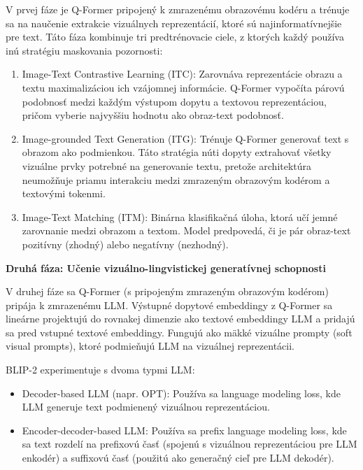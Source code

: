 \documentclass[]{tukediphc}
\begin{document}
V prvej fáze je Q-Former pripojený k zmrazenému obrazovému kodéru a trénuje sa na naučenie extrakcie vizuálnych reprezentácií, ktoré sú najinformatívnejšie pre text. Táto fáza kombinuje tri predtrénovacie ciele, z ktorých každý používa inú stratégiu maskovania pozornosti:

\begin{enumerate}
    \item Image-Text Contrastive Learning (ITC): Zarovnáva reprezentácie obrazu a textu maximalizáciou ich vzájomnej informácie. Q-Former vypočíta párovú podobnosť medzi každým výstupom dopytu a textovou reprezentáciou, pričom vyberie najvyššiu hodnotu ako obraz-text podobnosť.
    
    \item Image-grounded Text Generation (ITG): Trénuje Q-Former generovať text s obrazom ako podmienkou. Táto stratégia núti dopyty extrahovať všetky vizuálne prvky potrebné na generovanie textu, pretože architektúra neumožňuje priamu interakciu medzi zmrazeným obrazovým kodérom a textovými tokenmi.
    
    \item Image-Text Matching (ITM): Binárna klasifikačná úloha, ktorá učí jemné zarovnanie medzi obrazom a textom. Model predpovedá, či je pár obraz-text pozitívny (zhodný) alebo negatívny (nezhodný)\cite{BLIP2}.
\end{enumerate}

\textbf{Druhá fáza: Učenie vizuálno-lingvistickej generatívnej schopnosti}

V druhej fáze sa Q-Former (s pripojeným zmrazeným obrazovým kodérom) pripája k zmrazenému LLM. Výstupné dopytové embeddingy z Q-Former sa lineárne projektujú do rovnakej dimenzie ako textové embeddingy LLM a pridajú sa pred vstupné textové embeddingy. Fungujú ako mäkké vizuálne prompty (soft visual prompts), ktoré podmieňujú LLM na vizuálnej reprezentácii\cite{BLIP2}.

BLIP-2 experimentuje s dvoma typmi LLM:
\begin{itemize}
    \item Decoder-based LLM (napr. OPT): Používa sa language modeling loss, kde LLM generuje text podmienený vizuálnou reprezentáciou.
    \item Encoder-decoder-based LLM: Používa sa prefix language modeling loss, kde sa text rozdelí na prefixovú časť (spojenú s vizuálnou reprezentáciou pre LLM enkodér) a suffixovú časť (použitú ako generačný cieľ pre LLM dekodér).
\end{itemize}
\end{document}
